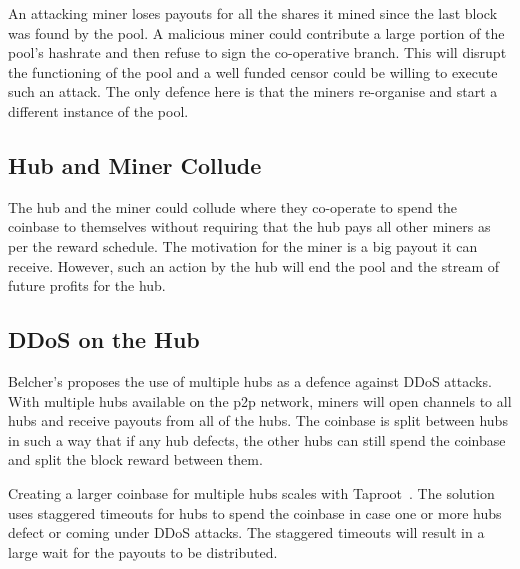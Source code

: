 \documentclass{article}
\begin{document}

An attacking miner loses payouts for all the shares it mined since the
last block was found by the pool. A malicious miner could contribute a
large portion of the pool's hashrate and then refuse to sign the
co-operative branch. This will disrupt the functioning of the pool and
a well funded censor could be willing to execute such an attack. The
only defence here is that the miners re-organise and start a different
instance of the pool.

\subsection{Hub and Miner Collude}\label{ref:collusion}

The hub and the miner could collude where they co-operate to spend the
coinbase to themselves without requiring that the hub pays all other
miners as per the reward schedule. The motivation for the miner is a
big payout it can receive. However, such an action by the hub will
end the pool and the stream of future profits for the hub.


\subsection{DDoS on the Hub}\label{ref:ddos-attack}

Belcher's proposes the use of multiple hubs as a defence against DDoS
attacks. With multiple hubs available on the p2p network, miners will
open channels to all hubs and receive payouts from all of the
hubs. The coinbase is split between hubs in such a way that if any hub
defects, the other hubs can still spend the coinbase and split the
block reward between them.

Creating a larger coinbase for multiple hubs scales with
Taproot~\cite{bip340,bip341, bip342}. The solution uses staggered
timeouts for hubs to spend the coinbase in case one or more hubs
defect or coming under DDoS attacks. The staggered timeouts will
result in a large wait for the payouts to be distributed.
\end{document}
